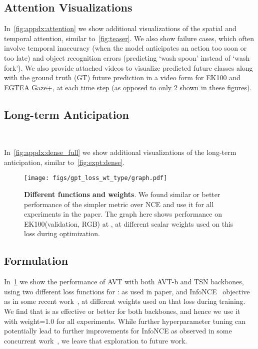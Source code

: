 \documentclass[10pt,twocolumn,letterpaper]{article}
\newcommand{\eknew}{EK100\xspace}
\newcommand{\egtea}{EGTEA Gaze+\xspace}
\newcommand{\method}{AVT\xspace}
\newcommand{\txBack}{\method{}-b\xspace}
\begin{document}
\subsection{Attention Visualizations}\label{sec:appdx:att_vis}

In~\cref{fig:appdx:attention} we show additional visualizations of the spatial and temporal attention, similar to~\cref{fig:teaser}. We also show failure cases, which often involve temporal inaccuracy (\ie when the model anticipates an action too soon or too late) and object recognition errors (predicting `wash spoon' instead of `wash fork').
We also provide attached videos to visualize predicted future classes along with the ground truth (GT) future prediction in a video form for \eknew and \egtea, at each time step (as opposed to only 2 shown in these figures).



\subsection{Long-term Anticipation}~\label{sec:appdx:dense_anticip}

In~\cref{fig:appdx:dense_full} we show additional visualizations of the long-term anticipation, similar to~\cref{fig:expt:dense}.

\begin{figure}[t]
    \centering
    \texttt{[image: figs/gpt\_loss\_wt\_type/graph.pdf]}
    \caption{{\bf Different  functions and weights}. We found similar or better performance of the simpler  metric over NCE and use it for all experiments in the paper. The graph here shows performance on \eknew (validation, RGB) at , at different scalar weights used on this loss during optimization.
    }\label{fig:appdx:gpt_loss}
\end{figure}
 
\subsection{ Formulation}\label{sec:appdx:gpt_loss}

In~\cref{fig:appdx:gpt_loss} we show the performance of \method with both \txBack and TSN backbones, using two different loss functions for :  as used in paper, and InfoNCE~\cite{oord2018representation} objective as in some recent work~\cite{han2020memdpc,wu2021imaginernn}, at different weights used on that loss during training. We find that  is as effective or better for both backbones, and hence we use it with weight=1.0 for all experiments. While further hyperparameter tuning can potentially lead to further improvements for InfoNCE as observed in some concurrent work~\cite{wu2021imaginernn}, we leave that exploration to future work.
\end{document}
